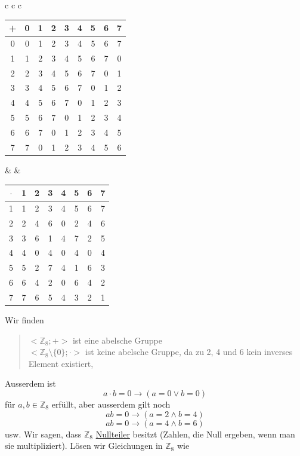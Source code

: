 \documentclass{report}
\begin{document}
\begin{center}
\begin{tabular}{c c c}
\begin{tabular}{c | c c c c c c c c}
+ & 0 & 1& 2 & 3 & 4 & 5 & 6 & 7\\
\hline
0 & 0 & 1 & 2 & 3 & 4 & 5 & 6 & 7\\
1 & 1 & 2 & 3 & 4 & 5 & 6 & 7 & 0\\
2 & 2 & 3 & 4 & 5 & 6 & 7 & 0 & 1\\
3 & 3 & 4 & 5 & 6 & 7 & 0 & 1 & 2\\
4 & 4 & 5 & 6 & 7 & 0 & 1 & 2 & 3\\
5 & 5 & 6 & 7 & 0 & 1 & 2 & 3 & 4\\
6 & 6 & 7 & 0 & 1 & 2 & 3 & 4 & 5\\
7 & 7 & 0 & 1 & 2 & 3 & 4 & 5 & 6
\end{tabular}
& &
\begin{tabular}{c | c c c c c c c}
$\cdot$ & 1 & 2 & 3 & 4 & 5 & 6 & 7\\
\hline
1 & 1 & 2 & 3 & 4 & 5 & 6 & 7\\
2 & 2 & 4 & 6 & 0 & 2 & 4 & 6\\
3 & 3 & 6 & 1 & 4 & 7 & 2 & 5\\
4 & 4 & 0 & 4 & 0 & 4 & 0 & 4\\
5 & 5 & 2 & 7 & 4 & 1 & 6 & 3\\
6 & 6 & 4 & 2 & 0 & 6 & 4 & 2\\
7 & 7 & 6 & 5 & 4 & 3 & 2 & 1
\end{tabular}
\end{tabular}\end{center}
Wir finden
\begin{quote}$< \mathbb{Z}_8 ;  + >$ ist eine abelsche Gruppe\\
$< \mathbb{Z}_8 \setminus \{0\} ; \cdot >$ ist keine abelsche Gruppe, da zu 2, 4 und 6 kein inverses Element existiert,\end{quote}
Ausserdem ist
\begin{equation}a \cdot b = 0 \to (a = 0 \lor b = 0)\end{equation}
für $a, b \in \mathbb{Z}_8$ erfüllt, aber ausserdem gilt noch
\begin{equation}ab = 0 \to (a = 2 \land b =4)\end{equation}
\begin{equation}ab = 0 \to (a = 4 \land b = 6)\end{equation}
usw. Wir sagen, dass $\mathbb{Z}_8$ \underline{Nullteiler} besitzt (Zahlen, die Null ergeben, wenn man sie multipliziert). Lösen wir Gleichungen in $\mathbb{Z}_8$ wie
\end{document}
